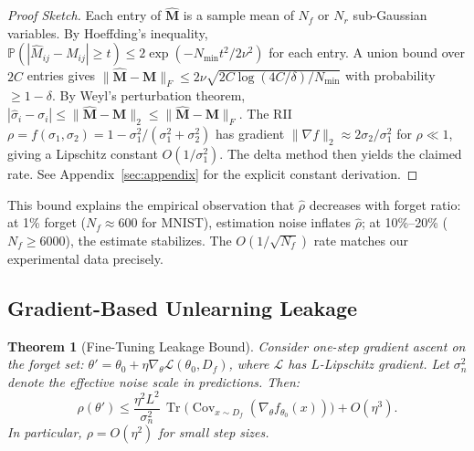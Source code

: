 \documentclass[journal]{IEEEtran}
\newtheorem{theorem}{Theorem}[section]
\theoremstyle{definition}
\begin{document}
\begin{proof}[Proof Sketch]
Each entry of $\hat{\mathbf{M}}$ is a sample mean of $N_f$ or $N_r$ sub-Gaussian variables. By Hoeffding's inequality, $\mathbb{P}(|\hat{M}_{ij} - M_{ij}| \ge t) \le 2\exp(-N_{\min} t^2 / 2\nu^2)$ for each entry. A union bound over $2C$ entries gives $\|\hat{\mathbf{M}} - \mathbf{M}\|_F \le 2\nu\sqrt{2C\log(4C/\delta)/N_{\min}}$ with probability $\ge 1-\delta$. By Weyl's perturbation theorem, $|\hat{\sigma}_i - \sigma_i| \le \|\hat{\mathbf{M}} - \mathbf{M}\|_2 \le \|\hat{\mathbf{M}} - \mathbf{M}\|_F$. The RII $\rho = f(\sigma_1,\sigma_2) = 1 - \sigma_1^2/(\sigma_1^2+\sigma_2^2)$ has gradient $\|\nabla f\|_2 \approx 2\sigma_2/\sigma_1^2$ for $\rho \ll 1$, giving a Lipschitz constant $O(1/\sigma_1^2)$. The delta method then yields the claimed rate. See Appendix~\ref{sec:appendix} for the explicit constant derivation.
\end{proof}

This bound explains the empirical observation that $\hat{\rho}$ decreases with forget ratio: at 1\% forget ($N_f \approx 600$ for MNIST), estimation noise inflates $\hat{\rho}$; at 10\%--20\% ($N_f \ge 6000$), the estimate stabilizes. The $O(1/\sqrt{N_f})$ rate matches our experimental data precisely.

\subsection{Gradient-Based Unlearning Leakage}

\begin{theorem}[Fine-Tuning Leakage Bound]
\label{thm:finetune}
Consider one-step gradient ascent on the forget set: $\theta' = \theta_0 + \eta \nabla_\theta \mathcal{L}(\theta_0, D_f)$, where $\mathcal{L}$ has $L$-Lipschitz gradient. Let $\sigma_n^2$ denote the effective noise scale in predictions. Then:
\begin{equation}
\boxed{\rho(\theta') \le
\frac{\eta^2 L^2}{\sigma_n^2}\,
\operatorname{Tr}\bigl(\operatorname{Cov}_{x\sim D_f}(\nabla_\theta f_{\theta_0}(x))\bigr)
+ O(\eta^3).}
\label{eq:finetune_bound}
\end{equation}
In particular, $\rho = O(\eta^2)$ for small step sizes.
\end{theorem}
\end{document}
